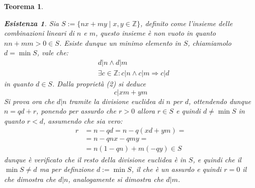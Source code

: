 \documentclass{article}
\makeatletter
\renewenvironment{proof}[1][\proofname]{\par
    \pushQED{\qed}%
    \normalfont \topsep6\p@\@plus6\p@\relax
    \trivlist
    \item\relax
    {\itshape
    #1\@addpunct{.}}\hspace\labelsep\ignorespaces
    }{%
    \popQED\endtrivlist\@endpefalse
}
\newtheorem{theorem}{Teorema}[part]
\theoremstyle{definition}
\newtheorem*{existence}{Esistenza}
\makeatother
\begin{document}
\begin{theorem}
\begin{proof}
\begin{existence}
            Sia \(S:=\{nx+my\mid x,y\in\mathbb{Z}\}\), definito come l'insieme delle combinazioni lineari di \(n\) e \(m\), questo insieme è non vuoto in quanto \(nn+mm>0\in S\).
            Esiste dunque un minimo elemento in \(S\), chiamiamolo \(d=\min S\), vale che: 
            \[
                \begin{aligned}
                    &d|n \wedge d|m\\
                    &\exists c\in\mathbb{Z}: c|n \wedge c|m \Rightarrow c|d
                \end{aligned}
            \]
            in quanto \(d\in S\).
            Dalla proprietà (2) si deduce \[c|xm+ym\]
            Si prova ora che \(d|n\) tramite la divisione euclidea di \(n\) per \(d\), ottendendo dunque \(n=qd+r\), ponendo per assurdo che \(r>0\) allora \(r\in S\) e quindi \(d\neq \min S\) in quanto \(r<d\), assumendo che sia vero:
            \[
                \begin{aligned}
                    r&=n-qd=n-q(xd+ym)=\\
                    &=n-qnx-qmy=\\
                    &=n(1-qn)+m(-qy)\in S
                \end{aligned}
            \]
            dunque è verificato che il resto della divisione euclidea è in \(S\), e quindi che il \(\min S\neq d\) ma per definzione \(d:=\min S\), il che è un assurdo e quindi \(r=0\) il che dimostra che \(d|n\), analogamente si dimostra che \(d|m\).
        \end{existence}
        \raggedleft{\pushQED{\ensuremath{\blacksquare}}}
    \end{proof}
\end{theorem}
\end{document}
